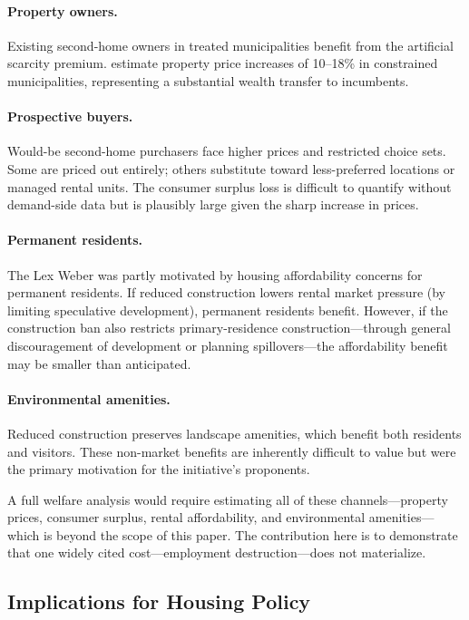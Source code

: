 \documentclass[12pt]{article}
\begin{document}
\paragraph{Property owners.} Existing second-home owners in treated municipalities benefit from the artificial scarcity premium. \citet{hilber2019} estimate property price increases of 10--18\% in constrained municipalities, representing a substantial wealth transfer to incumbents.

\paragraph{Prospective buyers.} Would-be second-home purchasers face higher prices and restricted choice sets. Some are priced out entirely; others substitute toward less-preferred locations or managed rental units. The consumer surplus loss is difficult to quantify without demand-side data but is plausibly large given the sharp increase in prices.

\paragraph{Permanent residents.} The Lex Weber was partly motivated by housing affordability concerns for permanent residents. If reduced construction lowers rental market pressure (by limiting speculative development), permanent residents benefit. However, if the construction ban also restricts primary-residence construction---through general discouragement of development or planning spillovers---the affordability benefit may be smaller than anticipated.

\paragraph{Environmental amenities.} Reduced construction preserves landscape amenities, which benefit both residents and visitors. These non-market benefits are inherently difficult to value but were the primary motivation for the initiative's proponents.

A full welfare analysis would require estimating all of these channels---property prices, consumer surplus, rental affordability, and environmental amenities---which is beyond the scope of this paper. The contribution here is to demonstrate that one widely cited cost---employment destruction---does not materialize.

\subsection{Implications for Housing Policy}
\end{document}
